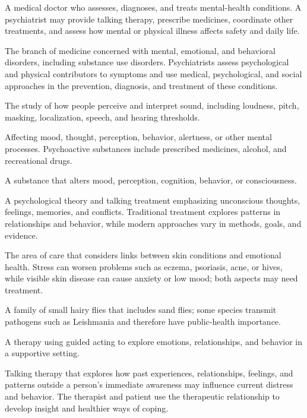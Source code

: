  A medical doctor who assesses, diagnoses, and treats mental-health conditions. A psychiatrist may provide talking therapy, prescribe medicines, coordinate other treatments, and assess how mental or physical illness affects safety and daily life.

 The branch of medicine concerned with mental, emotional, and behavioral disorders,
including substance use disorders. Psychiatrists assess psychological and physical
contributors to symptoms and use medical, psychological, and social approaches in the
prevention, diagnosis, and treatment of these conditions.

 The study of how people perceive and interpret sound, including loudness, pitch, masking, localization, speech, and hearing thresholds.

 Affecting mood, thought, perception, behavior, alertness, or other mental processes. Psychoactive substances include prescribed medicines, alcohol, and recreational drugs.

 A substance that alters mood, perception, cognition, behavior, or consciousness.

 A psychological theory and talking treatment emphasizing unconscious thoughts, feelings, memories, and conflicts. Traditional treatment explores patterns in relationships and behavior, while modern approaches vary in methods, goals, and evidence.

 The area of care that considers links between skin conditions and emotional health. Stress can worsen problems such as eczema, psoriasis, acne, or hives, while visible skin disease can cause anxiety or low mood; both aspects may need treatment.

 A family of small hairy flies that includes sand flies; some species transmit pathogens such as Leishmania and therefore have public-health importance.

 A therapy using guided acting to explore emotions, relationships, and behavior in a supportive setting.

 Talking therapy that explores how past experiences, relationships, feelings, and patterns outside a person’s immediate awareness may influence current distress and behavior. The therapist and patient use the therapeutic relationship to develop insight and healthier ways of coping.

